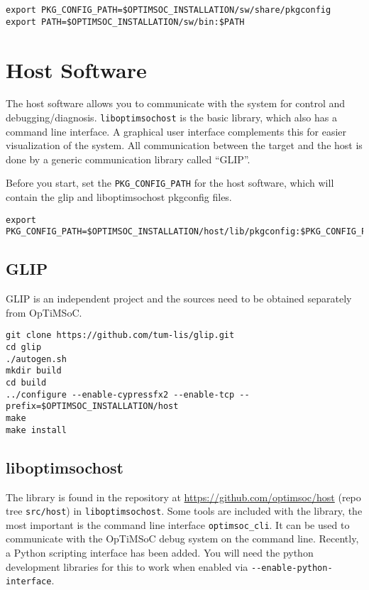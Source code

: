 \begin{lstlisting}
export PKG_CONFIG_PATH=$OPTIMSOC_INSTALLATION/sw/share/pkgconfig
export PATH=$OPTIMSOC_INSTALLATION/sw/bin:$PATH
\end{lstlisting}

\section{Host Software}

The host software allows you to communicate with the system for
control and debugging/diagnosis. \verb|liboptimsochost| is the basic
library, which also has a command line interface. A graphical user
interface complements this for easier visualization of the system. All
communication between the target and the host is done by a generic communication
library called ``GLIP''.

Before you start, set the \verb|PKG_CONFIG_PATH| for the host software, which
will contain the glip and liboptimsochost pkgconfig files.

\begin{lstlisting}
export PKG_CONFIG_PATH=$OPTIMSOC_INSTALLATION/host/lib/pkgconfig:$PKG_CONFIG_PATH
\end{lstlisting}

\subsection{GLIP}

GLIP is an independent project and the sources need to be obtained separately
from OpTiMSoC.

\begin{lstlisting}
git clone https://github.com/tum-lis/glip.git
cd glip
./autogen.sh
mkdir build
cd build
../configure --enable-cypressfx2 --enable-tcp --prefix=$OPTIMSOC_INSTALLATION/host
make
make install
\end{lstlisting}

\subsection{liboptimsochost}

The library is found in the repository at
\url{https://github.com/optimsoc/host} (repo tree \verb|src/host|) in
\verb|liboptimsochost|.  Some tools are included with the library, the
most important is the command line interface \verb|optimsoc_cli|. It
can be used to communicate with the OpTiMSoC debug system on the
command line. Recently, a Python scripting interface has been
added. You will need the python development libraries for this to work
when enabled via \verb|--enable-python-interface|.

